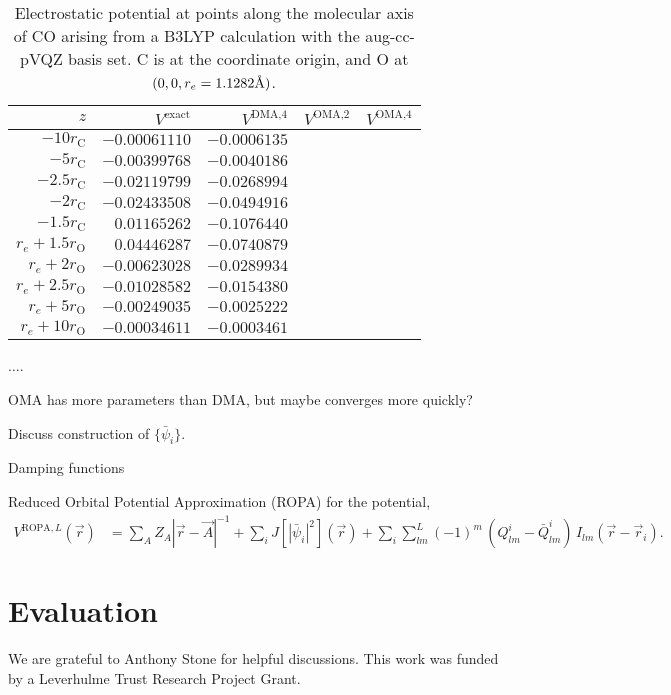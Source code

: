 \documentclass[journal=jacsat,manuscript=article]{achemso}
\begin{document}
\begin{table}[h]
    \centering
    \begin{tabular}{r|rrrr|}
        $z$ & $V^{\text{exact}}$ 
        &$V^{\text{DMA,4}}$
        &$V^{\text{OMA,2}}$
        &$V^{\text{OMA,4}}$
        \\
        \hline
         $-10 r_{\text{C}}$ %
         & $-0.00061110$
&$-0.0006135$
         \\
         $-5 r_{\text{C}}$ %
         & $-0.00399768$
&$-0.0040186$
         \\
         $-2.5 r_{\text{C}}$ %
         & $-0.02119799$
&$-0.0268994$
         \\
         $-2 r_{\text{C}}$ %
         & $-0.02433508$
&$-0.0494916$
         \\
         $-1.5 r_{\text{C}}$ %
         & $0.01165262$
&$-0.1076440$
         \\
         $r_e+1.5 r_{\text{O}}$ %
         & $0.04446287$
&$-0.0740879$
         \\
         $r_e+2 r_{\text{O}}$ %
         & $-0.00623028$
&$-0.0289934$
         \\
         $r_e+2.5 r_{\text{O}}$ %
         & $-0.01028582$
&$-0.0154380$
         \\
         $r_e+5 r_{\text{O}}$ %
         & $-0.00249035$
&$-0.0025222$
         \\
         $r_e+10 r_{\text{O}}$ %
         & $-0.00034611$
&$-0.0003461$
         \\
         \hline
    \end{tabular}
    \caption{Electrostatic potential at points along the molecular axis of CO arising from a B3LYP calculation with the aug-cc-pVQZ basis set\cite{Kendall1992}. C is at the coordinate origin, and O at $(0,0,r_e=1.1282\text\AA)$. }
    \label{tab:1}
\end{table}
$\dots$.

OMA has more parameters than DMA, but maybe converges more quickly?

Discuss construction of $\{\bar\psi_i\}$.

Damping functions\cite{Koide1981a,Tang1984AnCoefficients,Knowles1986,Knowles1986a,Knowles1987a}

Reduced Orbital Potential Approximation (ROPA) for the potential,
\begin{align}
    V^{\text{ROPA},L}(\vec r) &=
    \sum_A Z_A |\vec r
    - \vec A|^{-1}
    +\sum_i J\left[\left|\bar\psi_i\right|^2\right](\vec r)
    +\sum_i \sum_{lm}^L (-1)^m\,\left(Q^i_{lm}-\bar Q^i_{lm}\right)\, I_{lm}(\vec r - \vec r_i)
    .
\end{align}
\section{Evaluation}

\begin{acknowledgement}

We are grateful to Anthony Stone for helpful discussions.
This work was funded by a Leverhulme Trust Research Project Grant.

\end{acknowledgement}

\begin{suppinfo}


\end{suppinfo}


\end{document}
